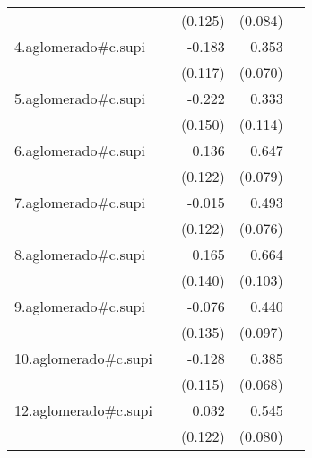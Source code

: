 {\begin{longtable}{l*{4}{D{.}{.}{-1}}}
            &                     &     (0.125)         &     (0.084)         &                     \\
\addlinespace
4.aglomerado#c.supi&                     &      -0.183         &       0.353\sym{***}&                     \\
            &                     &     (0.117)         &     (0.070)         &                     \\
\addlinespace
5.aglomerado#c.supi&                     &      -0.222         &       0.333\sym{**} &                     \\
            &                     &     (0.150)         &     (0.114)         &                     \\
\addlinespace
6.aglomerado#c.supi&                     &       0.136         &       0.647\sym{***}&                     \\
            &                     &     (0.122)         &     (0.079)         &                     \\
\addlinespace
7.aglomerado#c.supi&                     &      -0.015         &       0.493\sym{***}&                     \\
            &                     &     (0.122)         &     (0.076)         &                     \\
\addlinespace
8.aglomerado#c.supi&                     &       0.165         &       0.664\sym{***}&                     \\
            &                     &     (0.140)         &     (0.103)         &                     \\
\addlinespace
9.aglomerado#c.supi&                     &      -0.076         &       0.440\sym{***}&                     \\
            &                     &     (0.135)         &     (0.097)         &                     \\
\addlinespace
10.aglomerado#c.supi&                     &      -0.128         &       0.385\sym{***}&                     \\
            &                     &     (0.115)         &     (0.068)         &                     \\
\addlinespace
12.aglomerado#c.supi&                     &       0.032         &       0.545\sym{***}&                     \\
            &                     &     (0.122)         &     (0.080)         &                     \\

\end{longtable}}
